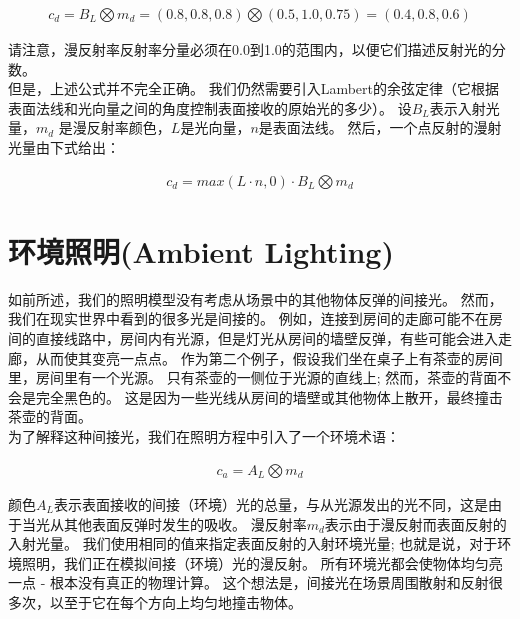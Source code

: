 \begin{align*}
c_{d}=B_{L}\bigotimes m_{d}=(0.8,0.8,0.8)\bigotimes (0.5,1.0,0.75)=(0.4,0.8,0.6)
\end{align*}

\begin{flushleft}
请注意，漫反射率反射率分量必须在0.0到1.0的范围内，以便它们描述反射光的分数。\\
但是，上述公式并不完全正确。 我们仍然需要引入Lambert的余弦定律（它根据表面法线和光向量之间的角度控制表面接收的原始光的多少）。 设$B_{L}$表示入射光量，$m_{d}$ 是漫反射率颜色，$L$是光向量，$n$是表面法线。 然后，一个点反射的漫射光量由下式给出：\\
\end{flushleft}

\begin{align*}\tag{eq.8.1}\label{eq.8.1}
c_{d}=max(L\cdot n, 0)\cdot B_{L}\bigotimes m_{d}
\end{align*}

\section{环境照明(Ambient Lighting)}
\begin{flushleft}
如前所述，我们的照明模型没有考虑从场景中的其他物体反弹的间接光。 然而，我们在现实世界中看到的很多光是间接的。 例如，连接到房间的走廊可能不在房间的直接线路中，房间内有光源，但是灯光从房间的墙壁反弹，有些可能会进入走廊，从而使其变亮一点点。 作为第二个例子，假设我们坐在桌子上有茶壶的房间里，房间里有一个光源。 只有茶壶的一侧位于光源的直线上; 然而，茶壶的背面不会是完全黑色的。 这是因为一些光线从房间的墙壁或其他物体上散开，最终撞击茶壶的背面。\\
为了解释这种间接光，我们在照明方程中引入了一个环境术语：\\
\end{flushleft}

\begin{align*}\tag{eq.8.2}\label{eq.8.2}
c_{a}=A_{L}\bigotimes m_{d}
\end{align*}

\begin{flushleft}
颜色$A_{L}$表示表面接收的间接（环境）光的总量，与从光源发出的光不同，这是由于当光从其他表面反弹时发生的吸收。 漫反射率$m_{d}$表示由于漫反射而表面反射的入射光量。 我们使用相同的值来指定表面反射的入射环境光量; 也就是说，对于环境照明，我们正在模拟间接（环境）光的漫反射。 所有环境光都会使物体均匀亮一点 - 根本没有真正的物理计算。 这个想法是，间接光在场景周围散射和反射很多次，以至于它在每个方向上均匀地撞击物体。
\end{flushleft}

